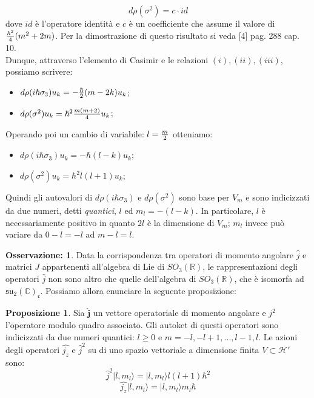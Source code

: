 \documentclass[12pt,a4paper]{report}
\theoremstyle{definition}
\theoremstyle{Theorem}
\newtheorem{Prop}[Def]{Proposizione}
\theoremstyle{definition}
\theoremstyle{definition}
\theoremstyle{definition}
\newtheorem{Obs}[Def]{Osservazione:}
\begin{document}
$$d\rho(\sigma^2)=c\cdot id$$ 
dove $id$ è l'operatore identità e $c$ è un coefficiente che assume il valore di ${\hbar^2\over 4}(m^2+2m)$. Per la dimostrazione di questo risultato si veda [4] pag. 288 cap. 10.\\
Dunque, attraverso l'elemento di Casimir e le relazioni $(i),(ii),(iii)$, possiamo scrivere:
	\begin{itemize}
		\centering
		\item $d\rho(i\hbar\sigma_3)u_k=-{\hbar\over 2}(m-2k)u_k$;
		\item $d\rho(\sigma^2)u_k=\hbar^2{m(m+2)\over 4}u_k$;
	\end{itemize}
Operando poi un cambio di variabile: $l={m\over2}$ otteniamo:
\begin{itemize}
	\centering
	\item $d\rho(i\hbar\sigma_3)u_k=-\hbar(l-k)u_k$;
	\item $d\rho(\sigma^2)u_k=\hbar^2l(l+1)u_k$;
\end{itemize}
Quindi gli autovalori di $d\rho(i\hbar\sigma_3)$ e $d\rho(\sigma^2)$ sono base per $V_m$ e sono indicizzati da due numeri, detti \textit{quantici}, $l$ ed $m_l=-(l-k)$. In particolare, $l$ è necessariamente positivo in quanto $2l$ è la dimensione di $V_m$; $m_l$ invece può variare da $0-l=-l$ ad $m-l=l$.
\begin{Obs}
	Data la corrispondenza tra operatori di momento angolare $\hat{j}$ e matrici $J$ appartenenti all'algebra di Lie di $SO_3(\mathbb{R})$, le rappresentazioni degli operatori $\hat{j}$ non sono altro che quelle dell'algebra di $SO_3(\mathbb{R})$, che è isomorfa ad $\mathfrak{su_2(\mathbb{C})_c}$.
	Possiamo allora enunciare la seguente proposizione:
\end{Obs}
\begin{Prop}
	Sia $\hat{\textbf{j}}$ un vettore operatoriale di momento angolare e $j^2$ l'operatore modulo quadro associato. Gli autoket di questi operatori sono indicizzati da due numeri quantici: $l\geq0$ e $m=-l,-l+1,...,l-1,l$. Le azioni degli operatori $\hat{j_z}$ e $\hat{j}^2$ su di uno spazio vettoriale a dimensione finita $V\subset \mathcal{H'}$ sono:
	$$\hat{j}^2|l,m_l\rangle=|l,m_l\rangle l(l+1)\hbar^2$$ 
	$$\hat{j_z}|l,m_l\rangle=|l,m_l\rangle m_l\hbar$$
\end{Prop}
\end{document}
